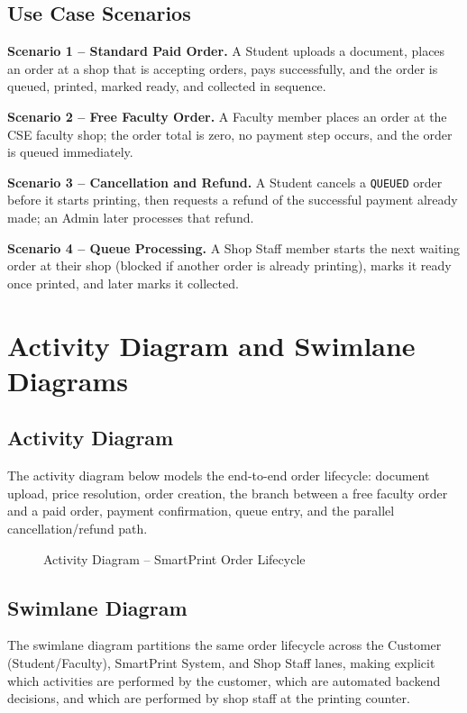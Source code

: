 \documentclass[12pt,a4paper]{report}
\newcommand{\DiagramPlaceholder}[3]{%
  \begin{figure}[H]
    \centering
    \fbox{%
      \begin{minipage}[c][#1][c]{0.92\linewidth}
        \centering\itshape\color{gray} #2
      \end{minipage}%
    }
    \caption{#3}
  \end{figure}%
}
\begin{document}
\subsection{Use Case Scenarios}

\textbf{Scenario 1 -- Standard Paid Order.} A Student uploads a document, places an order at a shop that is accepting orders, pays successfully, and the order is queued, printed, marked ready, and collected in sequence.

\textbf{Scenario 2 -- Free Faculty Order.} A Faculty member places an order at the CSE faculty shop; the order total is zero, no payment step occurs, and the order is queued immediately.

\textbf{Scenario 3 -- Cancellation and Refund.} A Student cancels a \texttt{QUEUED} order before it starts printing, then requests a refund of the successful payment already made; an Admin later processes that refund.

\textbf{Scenario 4 -- Queue Processing.} A Shop Staff member starts the next waiting order at their shop (blocked if another order is already printing), marks it ready once printed, and later marks it collected.

\section{Activity Diagram and Swimlane Diagrams}

\subsection{Activity Diagram}
The activity diagram below models the end-to-end order lifecycle: document upload, price resolution, order creation, the branch between a free faculty order and a paid order, payment confirmation, queue entry, and the parallel cancellation/refund path.

\DiagramPlaceholder{6.5cm}{[SPACE FOR ACTIVITY DIAGRAM]}{Activity Diagram -- SmartPrint Order Lifecycle}

\subsection{Swimlane Diagram}
The swimlane diagram partitions the same order lifecycle across the Customer (Student/Faculty), SmartPrint System, and Shop Staff lanes, making explicit which activities are performed by the customer, which are automated backend decisions, and which are performed by shop staff at the printing counter.
\end{document}
